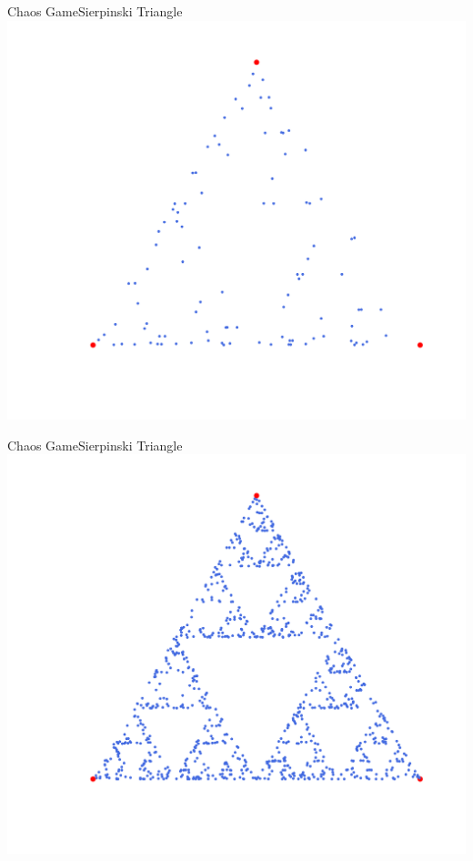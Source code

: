 \documentclass[usenames,dvipsnames,svgnames,10pt,aspectratio=169]{beamer}
\begin{document}
\begin{frame}[t, c]{Chaos Game}{Sierpinski Triangle}
	\centering
	\includegraphics[height=.9\textheight]{sierpinsky_1}
	\vspace{2cm}
\end{frame}

\begin{frame}[t, c]{Chaos Game}{Sierpinski Triangle}
	\centering
	\includegraphics[height=.9\textheight]{sierpinsky_2}
	\vspace{2cm}
\end{frame}
\end{document}

